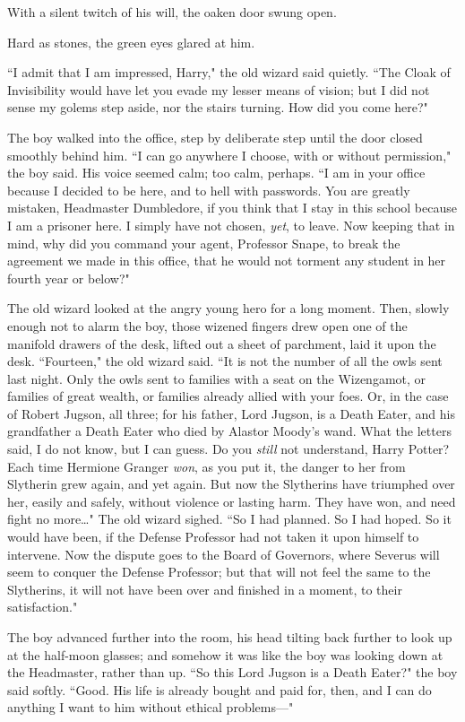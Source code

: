 With a silent twitch of his will, the oaken door swung open.

Hard as stones, the green eyes glared at him.

``I admit that I am impressed, Harry," the old wizard said quietly. ``The Cloak of Invisibility would have let you evade my lesser means of vision; but I did not sense my golems step aside, nor the stairs turning. How did you come here?"

The boy walked into the office, step by deliberate step until the door closed smoothly behind him. ``I can go anywhere I choose, with or without permission," the boy said. His voice seemed calm; too calm, perhaps. ``I am in your office because I decided to be here, and to hell with passwords. You are greatly mistaken, Headmaster Dumbledore, if you think that I stay in this school because I am a prisoner here. I simply have not chosen, \emph{yet}, to leave. Now keeping that in mind, why did you command your agent, Professor Snape, to break the agreement we made in this office, that he would not torment any student in her fourth year or below?"

The old wizard looked at the angry young hero for a long moment. Then, slowly enough not to alarm the boy, those wizened fingers drew open one of the manifold drawers of the desk, lifted out a sheet of parchment, laid it upon the desk. ``Fourteen," the old wizard said. ``It is not the number of all the owls sent last night. Only the owls sent to families with a seat on the Wizengamot, or families of great wealth, or families already allied with your foes. Or, in the case of Robert Jugson, all three; for his father, Lord Jugson, is a Death Eater, and his grandfather a Death Eater who died by Alastor Moody's wand. What the letters said, I do not know, but I can guess. Do you \emph{still} not understand, Harry Potter? Each time Hermione Granger \emph{won}, as you put it, the danger to her from Slytherin grew again, and yet again. But now the Slytherins have triumphed over her, easily and safely, without violence or lasting harm. They have won, and need fight no more{\ldots}" The old wizard sighed. ``So I had planned. So I had hoped. So it would have been, if the Defense Professor had not taken it upon himself to intervene. Now the dispute goes to the Board of Governors, where Severus will seem to conquer the Defense Professor; but that will not feel the same to the Slytherins, it will not have been over and finished in a moment, to their satisfaction."

The boy advanced further into the room, his head tilting back further to look up at the half-moon glasses; and somehow it was like the boy was looking down at the Headmaster, rather than up. ``So this Lord Jugson is a Death Eater?" the boy said softly. ``Good. His life is already bought and paid for, then, and I can do anything I want to him without ethical problems—"

